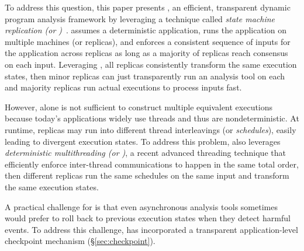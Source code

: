 

To address this question, this paper presents \xxx, an efficient, 
transparent dynamic program analysis framework by leveraging a technique called 
\emph{state machine replication (or \smr)}~\cite{paxos:simple, 
paxos:practical, paxos}. \smr assumes a deterministic application, runs the 
application on multiple machines (or replicas), and enforces a consistent 
sequence of inputs for the application across replicas as long as a majority of 
replicas reach consensus on each input. Leveraging \smr, all replicas
consistently transform the same execution states, then minor replicas can just
transparently run an analysis tool on each and majority
replicas run actual executions to process inputs fast.


However, \smr alone is not sufficient to construct multiple equivalent 
executions because today's applications widely use threads and thus are 
nondeterministic. At runtime, replicas may run into different thread
interleavings (or \emph{schedules}), easily leading to divergent execution
states. To address this problem, \xxx also leverages \emph{deterministic
multithreading (or \dmt)}, a recent advanced threading technique that
efficiently enforce inter-thread communications to happen in the same total
order, then different replicas run the same schedules on the same input and
transform the same execution states.


A practical challenge for \xxx is that even asynchronous analysis tools
sometimes would prefer to roll back to previous execution states when they
detect harmful events. To address this challenge, \xxx has incorporated a
transparent application-level checkpoint mechanism (\S\ref{sec:checkpoint}).


